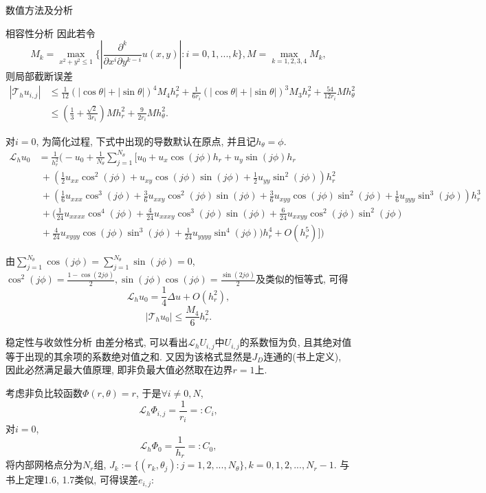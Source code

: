 \documentclass{article}
\begin{document}
\begin{section}{数值方法及分析}
\begin{subsection}{相容性分析}
        因此若令$$M_k=\max_{x^2+y^2\leq 1}\bigg\{ |\frac{\partial^k }{\partial x^i\partial y^{k-i}}u(x,y)|:i=0,1,...,k\bigg\}, M=\max_{k=1,2,3,4}M_k,$$ 则局部截断误差
        \begin{align*}
            |\mathcal{T}_h u_{i,j}| &\leq \frac{1}{12}(|\cos\theta|+|\sin\theta|)^4M_4h_r^2 + \frac{1}{6r_i}(|\cos\theta|+|\sin\theta|)^3M_3h_r^2 + \frac{54}{12r_i}Mh_\theta^2 \\
        &\leq (\frac{1}{3} + \frac{\sqrt{2}}{3r_i})Mh_r^2 + \frac{9}{2r_i}Mh_\theta^2.
        \end{align*}
        
        对$i=0$, 为简化过程, 下式中出现的导数默认在原点, 并且记$h_\theta=\phi$.
        \begin{align*}
            \mathcal{L}_h u_0  &= \frac{1}{h_r^2}\bigg(-u_0+\frac{1}{N_\theta}\sum_{j=1}^{N_\theta} \big[ u_0 + u_x\cos(j\phi)h_r + u_y\sin(j\phi)h_r  \\
            &\ +(\frac{1}{2}u_{xx}\cos^2(j\phi) + u_{xy}\cos(j\phi)\sin(j\phi) + \frac{1}{2}u_{yy}\sin^2(j\phi))h_r^2 \\
            &\ +(\frac{1}{6}u_{xxx}\cos^3(j\phi) + \frac{3}{6}u_{xxy}\cos^2(j\phi)\sin(j\phi)+\frac{3}{6}u_{xyy}\cos(j\phi)\sin^2(j\phi) + \frac{1}{6}u_{yyy}\sin^3(j\phi))h_r^3 \\
            &\ +(\frac{1}{24}u_{xxxx}\cos^4(j\phi) + \frac{4}{24}u_{xxxy}\cos^3(j\phi)\sin(j\phi) + \frac{6}{24}u_{xxyy}\cos^2(j\phi)\sin^2(j\phi)  \\
            &\ + \frac{4}{24}u_{xyyy}\cos(j\phi)\sin^3(j\phi) + \frac{1}{24}u_{yyyy}\sin^4(j\phi))h_r^4 +O(h_r^5)\big]\bigg)
        \end{align*}
            
        由$\sum_{j=1}^{N_\theta} \cos(j\phi) = \sum_{j=1}^{N_\theta} \sin(j\phi) = 0$, $\cos^2(j\phi) = \frac{1-\cos(2j\phi)}{2},\sin(j\phi)\cos(j\phi)=\frac{\sin(2j\phi)}{2}$及类似的恒等式, 
        可得$$\mathcal{L}_h u_0 = \frac{1}{4}\Delta u + O(h_r^2), $$
        $$| \mathcal{T}_h u_0 |\leq \frac{M_4}{6}h_r^2.$$
    \end{subsection}
    \begin{subsection}{稳定性与收敛性分析}
        由差分格式, 可以看出$\mathcal{L}_hU_{i,j}$中$U_{i,j}$的系数恒为负, 且其绝对值等于出现的其余项的系数绝对值之和. 又因为该格式显然是$J_D$连通的(书上定义), 因此必然满足最大值原理, 即非负最大值必然取在边界$r=1$上.
        
        考虑非负比较函数$\Phi(r,\theta)=r$, 于是$\forall i\neq 0,N$,
        $$\mathcal{L}_h\Phi_{i,j} = \frac{1}{r_i}=:C_i, $$
        对$i=0$, 
        $$\mathcal{L}_h\Phi_0 = \frac{1}{h_r}=:C_0,$$
        将内部网格点分为$N_r$组, $J_k:=\{(r_k,\theta_j):j=1,2,...,N_\theta\},k=0,1,2,...,N_r-1$. 与书上定理1.6, 1.7类似, 可得误差$e_{i,j}$:


\end{subsection}
\end{section}
\end{document}
